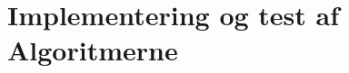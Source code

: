 \chapter{Implementering og test af Algoritmerne}
\label{ch:Implementering og test af Algoritmerne}


